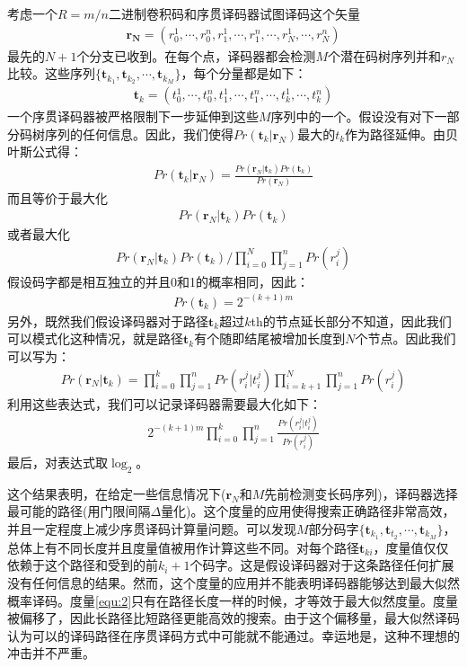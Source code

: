 \documentclass[twoside,numberorder]{buptthesis}
\begin{document}
考虑一个$R=m/n$二进制卷积码和序贯译码器试图译码这个矢量
\begin{eqnarray}
  \mathbf{r_N}=(r_0^1,\cdots ,r_0^n,r_1^1,\cdots ,r_1^n,\cdots ,r_N^1,\cdots
  ,r_N^n)
  \label{equ:3}
\end{eqnarray}
最先的$N+1$个分支已收到。在每个点，译码器都会检测$M$个潜在码树序列并和$r_N$比较。这些序列$\{\mathbf{t}_{k_1},\mathbf{t}_{k_2},\cdots
,\mathbf{t}_{k_M}\}$，每个分量都是如下：
\begin{eqnarray}
  \mathbf{t}_k=(t_0^1,\cdots ,t_0^n,t_1^1,\cdots ,t_1^n,\cdots ,t_k^1,\cdots
  ,t_k^n)
  \label{equ:4}
\end{eqnarray}
一个序贯译码器被严格限制下一步延伸到这些$M$序列中的一个。假设没有对下一部分码树序列的任何信息。因此，我们使得$Pr(\mathbf{t}_k|\mathbf{r}_N)$最大的$t_k$作为路径延伸。由贝叶斯公式得：
\begin{eqnarray}
  Pr(\mathbf{t}_k|\mathbf{r}_N)=\frac{Pr(\mathbf{r}_
  N|\mathbf{t}_k)Pr(\mathbf{t}_k)}{Pr(\mathbf{r}_N)}
  \label{equ:5}
\end{eqnarray}
而且等价于最大化
\begin{eqnarray}
  Pr(\mathbf{r}_N|\mathbf{t}_k)Pr(\mathbf{t}_k)
  \label{equ:6}
\end{eqnarray}
或者最大化
\begin{eqnarray}
  Pr(\mathbf{r}_N|\mathbf{t}_k)Pr(\mathbf{t}_k)/\prod\limits_{i=0}^N\prod\limits_{j=1}^nPr(r_i^j)
  \label{equ:7}
\end{eqnarray}
假设码字都是相互独立的并且0和1的概率相同，因此：
\begin{eqnarray}
  Pr(\mathbf{t}_k)=2^{-(k+1)m}
  \label{equ:8}
\end{eqnarray}
另外，既然我们假设译码器对于路径$\mathbf{t}_k$超过$k$th的节点延长部分不知道，因此我们可以模式化这种情况，就是路径$\mathbf{t}_k$有个随即结尾被增加长度到$N$个节点。因此我们可以写为：
\begin{eqnarray}
  Pr(\mathbf{r}_N|\mathbf{t}_k)=\prod\limits_{i=0}^k\prod\limits_{j=1}^nPr(r_i^j|t_i^j)\prod\limits_{i=k+1}^N\prod\limits_{j=1}^nPr(r_i^j)
  \label{equ:9}
\end{eqnarray}
利用这些表达式，我们可以记录译码器需要最大化如下：
\begin{eqnarray}
  2^{-(k+1)m}\prod\limits_{i=0}^k\prod\limits_{j=1}^n\frac{Pr(r_i^j|t_i^j)}{Pr(r_i^j)}
  \label{equ:10}
\end{eqnarray}
最后，对表达式取$\log_2$。

这个结果表明，在给定一些信息情况下($\mathbf{r}_N$和$M$先前检测变长码序列)，译码器选择最可能的路径(用门限间隔$\Delta$量化)。这个度量的应用使得搜索正确路径非常高效，并且一定程度上减少序贯译码计算量问题。可以发现$M$部分码字$\{\mathbf{t}_{k_1},\mathbf{t}_{t_2},\cdots
,\mathbf{t}_{k_M}\}$，总体上有不同长度并且度量值被用作计算这些不同。对每个路径$\mathbf{t}_{ki}$，度量值仅仅依赖于这个路径和受到的前$k_i+1$个码字。这是假设译码器对于这条路径任何扩展没有任何信息的结果。然而，这个度量的应用并不能表明译码器能够达到最大似然概率译码。度量\ref{equ:2}只有在路径长度一样的时候，才等效于最大似然度量。度量被偏移了，因此长路径比短路径更能高效的搜索。由于这个偏移量，最大似然译码认为可以的译码路径在序贯译码方式中可能就不能通过。幸运地是，这种不理想的冲击并不严重。
\end{document}

